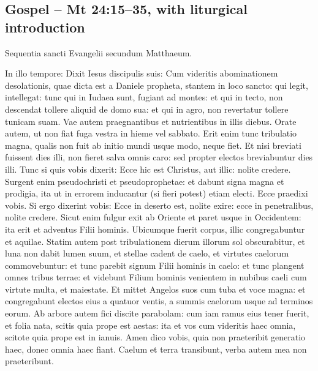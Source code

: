 \subsection{Gospel -- Mt 24:15--35, with liturgical introduction}
\label{proper-gospel}

\begin{latinproper}
Sequentia sancti Evangelii secundum Matthaeum.

In illo tempore: Dixit Iesus discipulis suis: Cum videritis abominationem
desolationis, quae dicta est a Daniele propheta, stantem in loco sancto:
qui legit, intellegat: tunc qui in Iudaea sunt, fugiant ad montes: et qui
in tecto, non descendat tollere aliquid de domo sua: et qui in agro, non
revertatur tollere tunicam suam. Vae autem praegnantibus et nutrientibus
in illis diebus. Orate autem, ut non fiat fuga vestra in hieme vel sabbato.
Erit enim tunc tribulatio magna, qualis non fuit ab initio mundi usque modo,
neque fiet. Et nisi breviati fuissent dies illi, non fieret salva omnis
caro: sed propter electos breviabuntur dies illi. Tunc si quis vobis
dixerit: Ecce hic est Christus, aut illic: nolite credere. Surgent enim
pseudochristi et pseudoprophetae: et dabunt signa magna et prodigia, ita
ut in errorem inducantur (si fieri potest) etiam electi. Ecce praedixi
vobis. Si ergo dixerint vobis: Ecce in deserto est, nolite exire: ecce
in penetralibus, nolite credere. Sicut enim fulgur exit ab Oriente et
paret usque in Occidentem: ita erit et adventus Filii hominis.
Ubicumque fuerit corpus, illic congregabuntur et aquilae. Statim autem
post tribulationem dierum illorum sol obscurabitur, et luna non dabit
lumen suum, et stellae cadent de caelo, et virtutes caelorum commovebuntur:
et tunc parebit signum Filii hominis in caelo: et tunc plangent omnes
tribus terrae: et videbunt Filium hominis venientem in nubibus caeli
cum virtute multa, et maiestate. Et mittet Angelos suos cum tuba et voce
magna: et congregabunt electos eius a quatuor ventis, a summis caelorum
usque ad terminos eorum. Ab arbore autem fici discite parabolam: cum
iam ramus eius tener fuerit, et folia nata, scitis quia prope est aestas:
ita et vos cum videritis haec omnia, scitote quia prope est in ianuis.
Amen dico vobis, quia non praeteribit generatio haec, donec omnia haec
fiant. Caelum et terra transibunt, verba autem mea non praeteribunt.
\end{latinproper}

